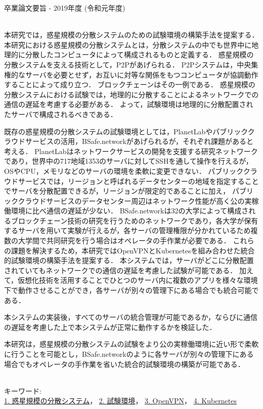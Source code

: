 卒業論文要旨 - 2019年度 (令和元年度)
\begin{center}
\begin{large}
\end{large}
\end{center}

~ \\
本研究では，惑星規模の分散システムのための試験環境の構築手法を提案する．
本研究における惑星規模の分散システムとは，分散システムの中でも世界中に地理的に分散したコンピュータによって構成されるものと定義する．
惑星規模の分散システムを支える技術として，P2Pがあげられる．
P2Pシステムは，中央集権的なサーバを必要とせず，お互いに対等な関係をもつコンピュータが協調動作することによって成り立つ．
ブロックチェーンはその一例である．
惑星規模の分散システムにおける試験では，地理的に分散することによるネットワークでの通信の遅延を考慮する必要がある．
よって，試験環境は地理的に分散配置されたサーバで構成されるべきである．

既存の惑星規模の分散システムの試験環境としては，PlanetLabやパブリッククラウドサービスの活用，BSafe.networkがあげられるが，それぞれ課題があると考える．
PlanetLabはネットワークサービスの開発を支援する研究ネットワークであり，世界中の717地域1353のサーバに対してSSHを通して操作を行えるが，OSやCPU，メモリなどのサーバの環境を柔軟に変更できない．
パブリッククラウドサービスでは，リージョンと呼ばれるデータセンターの地域を指定することでサーバを分散配置できるが，リージョンが限定的であることに加え，
パブリッククラウドサービスのデータセンター周辺はネットワーク性能が高く公の実稼働環境に比べ通信の遅延が少ない．
BSafe.networkは32の大学によって構成されるブロックチェーン技術の研究を行うためのネットワークであり，各大学が保有するサーバを用いて実験が行えるが，各サーバの管理権限が分かれているため複数の大学間で共同研究を行う場合はオペレータの手作業が必要である．
これらの課題を解決するため，本研究ではOpenVPNとKubernetesを組み合わせた統合的試験環境の構築手法を提案する．
本システムでは，サーバがどこに分散配置されていてもネットワークでの通信の遅延を考慮した試験が可能である．
加えて，仮想化技術を活用することでひとつのサーバ内に複数のアプリを様々な環境下で動作させることができ，各サーバが別々の管理下にある場合でも統合可能である．

本システムの実装後，すべてのサーバの統合管理が可能であるか，ならびに通信の遅延を考慮した上で本システムが正常に動作するかを検証した．

本研究は，惑星規模の分散システムの試験をより公の実稼働環境に近い形で柔軟に行うことを可能とし，BSafe.networkのように各サーバが別々の管理下にある場合でもオペレータの手作業を省いた統合的試験環境の構築が可能である．

~ \\
キーワード:\\
\underline{1. 惑星規模の分散システム}，
\underline{2. 試験環境}，
\underline{3. OpenVPN}，
\underline{4. Kubernetes}

\begin{flushright}
\dept \\
\author
\end{flushright}
